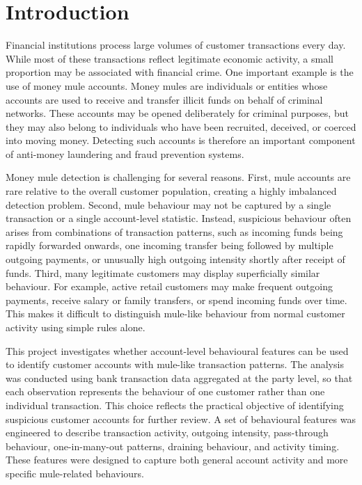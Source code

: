 \chapter{Introduction}

Financial institutions process large volumes of customer transactions every day. While most of these transactions reflect legitimate economic activity, a small proportion may be associated with financial crime. One important example is the use of money mule accounts. Money mules are individuals or entities whose accounts are used to receive and transfer illicit funds on behalf of criminal networks. These accounts may be opened deliberately for criminal purposes, but they may also belong to individuals who have been recruited, deceived, or coerced into moving money. Detecting such accounts is therefore an important component of anti-money laundering and fraud prevention systems.

Money mule detection is challenging for several reasons. First, mule accounts are rare relative to the overall customer population, creating a highly imbalanced detection problem. Second, mule behaviour may not be captured by a single transaction or a single account-level statistic. Instead, suspicious behaviour often arises from combinations of transaction patterns, such as incoming funds being rapidly forwarded onwards, one incoming transfer being followed by multiple outgoing payments, or unusually high outgoing intensity shortly after receipt of funds. Third, many legitimate customers may display superficially similar behaviour. For example, active retail customers may make frequent outgoing payments, receive salary or family transfers, or spend incoming funds over time. This makes it difficult to distinguish mule-like behaviour from normal customer activity using simple rules alone.

This project investigates whether account-level behavioural features can be used to identify customer accounts with mule-like transaction patterns. The analysis was conducted using bank transaction data aggregated at the party level, so that each observation represents the behaviour of one customer rather than one individual transaction. This choice reflects the practical objective of identifying suspicious customer accounts for further review. A set of behavioural features was engineered to describe transaction activity, outgoing intensity, pass-through behaviour, one-in-many-out patterns, draining behaviour, and activity timing. These features were designed to capture both general account activity and more specific mule-related behaviours.

